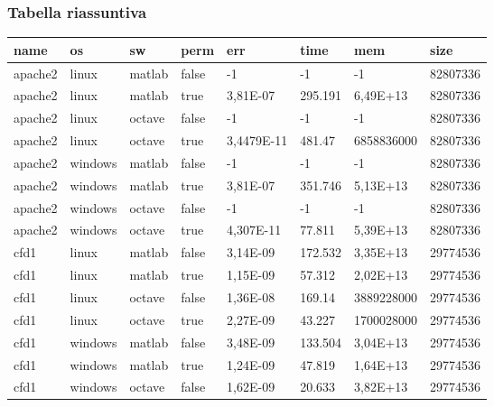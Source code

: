 \subsubsection{Tabella riassuntiva}
\begin{small}
\begin{longtable}{|l|l|l|l|l|l|l|l|}
\hline

name            & os      & sw     & perm   & err        & time     & mem        & size       \\
\endfirsthead
%
\endhead
%
\hline

apache2         & linux   & matlab & false & -1         & -1       & -1         & 82807336   \\
apache2         & linux   & matlab & true  & 3,81E-07   & 295.191  & 6,49E+13   & 82807336   \\
apache2         & linux   & octave & false & -1         & -1       & -1         & 82807336   \\
apache2         & linux   & octave & true  & 3,4479E-11 & 481.47   & 6858836000 & 82807336   \\
apache2         & windows & matlab & false & -1         & -1       & -1         & 82807336   \\
apache2         & windows & matlab & true  & 3,81E-07   & 351.746  & 5,13E+13   & 82807336   \\
apache2         & windows & octave & false & -1         & -1       & -1         & 82807336   \\
apache2         & windows & octave & true  & 4,307E-11  & 77.811   & 5,39E+13   & 82807336   \\
cfd1            & linux   & matlab & false & 3,14E-09   & 172.532  & 3,35E+13   & 29774536   \\
cfd1            & linux   & matlab & true  & 1,15E-09   & 57.312   & 2,02E+13   & 29774536   \\
cfd1            & linux   & octave & false & 1,36E-08   & 169.14   & 3889228000 & 29774536   \\
cfd1            & linux   & octave & true  & 2,27E-09   & 43.227   & 1700028000 & 29774536   \\
cfd1            & windows & matlab & false & 3,48E-09   & 133.504  & 3,04E+13   & 29774536   \\
cfd1            & windows & matlab & true  & 1,24E-09   & 47.819   & 1,64E+13   & 29774536   \\
cfd1            & windows & octave & false & 1,62E-09   & 20.633   & 3,82E+13   & 29774536   \\

\end{longtable}
\end{small}
